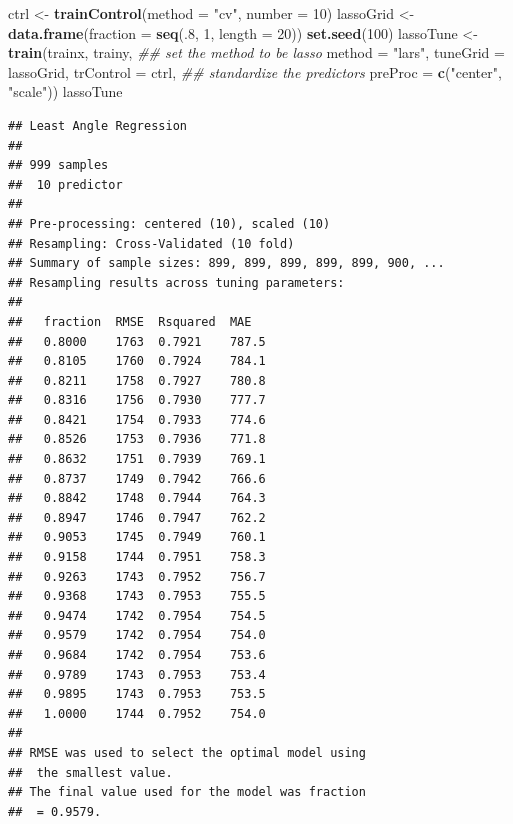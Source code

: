 \documentclass[12pt,]{krantz}
\makeatletter
\newenvironment{Shaded}{\begin{snugshade}}{\end{snugshade}}
\newcommand{\CommentTok}[1]{\textcolor[rgb]{0.37,0.37,0.37}{\textit{#1}}}
\newcommand{\DataTypeTok}[1]{\textcolor[rgb]{0.27,0.27,0.27}{#1}}
\newcommand{\DecValTok}[1]{\textcolor[rgb]{0.06,0.06,0.06}{#1}}
\newcommand{\KeywordTok}[1]{\textcolor[rgb]{0.27,0.27,0.27}{\textbf{#1}}}
\newcommand{\NormalTok}[1]{#1}
\newcommand{\StringTok}[1]{\textcolor[rgb]{0.5,0.5,0.5}{#1}}
\newenvironment{kframe}{%
\medskip{}
\setlength{\fboxsep}{.8em}
 \def\at@end@of@kframe{}%
 \ifinner\ifhmode%
  \def\at@end@of@kframe{\end{minipage}}%
  \begin{minipage}{\columnwidth}%
 \fi\fi%
 \def\FrameCommand##1{\hskip\@totalleftmargin \hskip-\fboxsep
 \colorbox{shadecolor}{##1}\hskip-\fboxsep
     \hskip-\linewidth \hskip-\@totalleftmargin \hskip\columnwidth}%
 \MakeFramed {\advance\hsize-\width
   \@totalleftmargin\z@ \linewidth\hsize
   \@setminipage}}%
 {\par\unskip\endMakeFramed%
 \at@end@of@kframe}
\renewenvironment{Shaded}{\begin{kframe}}{\end{kframe}}
\makeatother
\begin{document}
\begin{Shaded}
\begin{Highlighting}[]
\NormalTok{ctrl <-}\StringTok{ }\KeywordTok{trainControl}\NormalTok{(}\DataTypeTok{method =} \StringTok{"cv"}\NormalTok{, }\DataTypeTok{number =} \DecValTok{10}\NormalTok{)}
\NormalTok{lassoGrid <-}\StringTok{ }\KeywordTok{data.frame}\NormalTok{(}\DataTypeTok{fraction =} \KeywordTok{seq}\NormalTok{(.}\DecValTok{8}\NormalTok{, }\DecValTok{1}\NormalTok{, }\DataTypeTok{length =} \DecValTok{20}\NormalTok{))}
\KeywordTok{set.seed}\NormalTok{(}\DecValTok{100}\NormalTok{)}
\NormalTok{lassoTune <-}\StringTok{ }\KeywordTok{train}\NormalTok{(trainx, trainy,}
                      \CommentTok{## set the method to be lasso}
                      \DataTypeTok{method =} \StringTok{"lars"}\NormalTok{,}
                      \DataTypeTok{tuneGrid =}\NormalTok{ lassoGrid,}
                      \DataTypeTok{trControl =}\NormalTok{ ctrl,}
                      \CommentTok{## standardize the predictors}
                      \DataTypeTok{preProc =} \KeywordTok{c}\NormalTok{(}\StringTok{"center"}\NormalTok{, }\StringTok{"scale"}\NormalTok{))}
\NormalTok{lassoTune}
\end{Highlighting}
\end{Shaded}

\begin{verbatim}
## Least Angle Regression 
## 
## 999 samples
##  10 predictor
## 
## Pre-processing: centered (10), scaled (10) 
## Resampling: Cross-Validated (10 fold) 
## Summary of sample sizes: 899, 899, 899, 899, 899, 900, ... 
## Resampling results across tuning parameters:
## 
##   fraction  RMSE  Rsquared  MAE  
##   0.8000    1763  0.7921    787.5
##   0.8105    1760  0.7924    784.1
##   0.8211    1758  0.7927    780.8
##   0.8316    1756  0.7930    777.7
##   0.8421    1754  0.7933    774.6
##   0.8526    1753  0.7936    771.8
##   0.8632    1751  0.7939    769.1
##   0.8737    1749  0.7942    766.6
##   0.8842    1748  0.7944    764.3
##   0.8947    1746  0.7947    762.2
##   0.9053    1745  0.7949    760.1
##   0.9158    1744  0.7951    758.3
##   0.9263    1743  0.7952    756.7
##   0.9368    1743  0.7953    755.5
##   0.9474    1742  0.7954    754.5
##   0.9579    1742  0.7954    754.0
##   0.9684    1742  0.7954    753.6
##   0.9789    1743  0.7953    753.4
##   0.9895    1743  0.7953    753.5
##   1.0000    1744  0.7952    754.0
## 
## RMSE was used to select the optimal model using
##  the smallest value.
## The final value used for the model was fraction
##  = 0.9579.
\end{verbatim}
\end{document}
